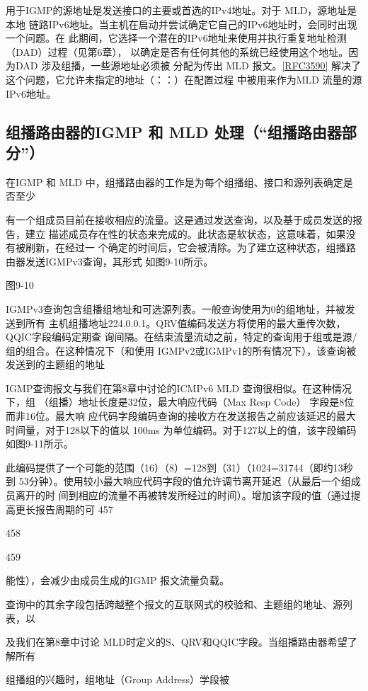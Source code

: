 用于IGMP的源地址是发送接口的主要或首选的IPv4地址。对于 MLD，源地址是本地
链路IPv6地址。当主机在启动并尝试确定它自己的IPv6地址时，会同时出现一个问题。在
此期间，它选择一个潜在的IPv6地址来使用并执行重复地址检测（DAD）过程（见第6章），
以确定是否有任何其他的系统已经使用这个地址。因为DAD 涉及组播，一些源地址必须被
分配为传出 MLD 报文。\href{https://www.rfc-editor.org/rfc/rfc3590}{[RFC3590]} 解决了这个问题，它允许未指定的地址（：：）在配置过程
中被用来作为MLD 流量的源IPv6地址。

\subsection{组播路由器的IGMP 和 MLD 处理（“组播路由器部分”）}
在IGMP 和 MLD 中，组播路由器的工作是为每个组播组、接口和源列表确定是否至少

有一个组成员目前在接收相应的流量。这是通过发送查询，以及基于成员发送的报告，建立
描述成员存在性的状态来完成的。此状态是软状态，这意味着，如果没有被刷新，在经过一
个确定的时间后，它会被清除。为了建立这种状态，组播路由器发送IGMPv3查询，其形式
如图9-10所示。

图9-10

IGMPv3查询包含组播组地址和可选源列表。一般查询使用为0的组地址，并被发送到所有
主机组播地址224.0.0.1。QRV值编码发送方将使用的最大重传次数，QQIC字段编码定期查
询间隔。在结束流量流动之前，特定的查询用于组或是源/组的组合。在这种情况下（和使用
IGMPv2或IGMPv1的所有情况下），该查询被发送到的主题组的地址

IGMP查询报文与我们在第8章中讨论的ICMPv6 MLD 查询很相似。在这种情况下，组
（组播）地址长度是32位，最大响应代码（Max Resp Code） 字段是8位而非16位。最大响
应代码字段编码查询的接收方在发送报告之前应该延迟的最大时间量，对于128以下的值以
100ms 为单位编码。对于127以上的值，该字段编码如图9-11所示。

此编码提供了一个可能的范围（16）（8）=128到（31）（1024=31744（即约13秒到
53分钟）。使用较小最大响应代码字段的值允许调节离开延迟（从最后一个组成员离开的时
间到相应的流量不再被转发所经过的时间）。增加该字段的值（通过提高更长报告周期的可
457

458

459

能性），会减少由成员生成的IGMP 报文流量负载。

查询中的其余字段包括跨越整个报文的互联网式的校验和、主题组的地址、源列表，以

及我们在第8章中讨论 MLD时定义的S、QRV和QQIC字段。当组播路由器希望了解所有

组播组的兴趣时，组地址（Group Address）学段被

